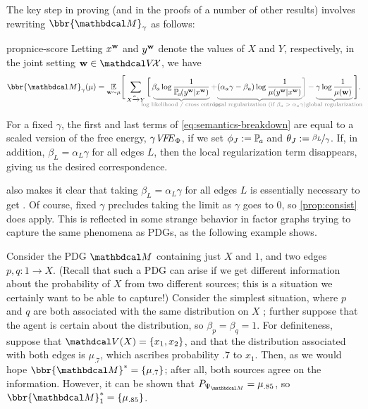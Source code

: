 The key step in proving 
(and in the proofs of a number of other results) involves 
rewriting  
$\bbr{\dg M}_\gamma$ as follows: 
\begin{linked}{prop}{nice-score}%
 Letting $x^{\mathbf w}$ and $y^{\mathbf w}$ denote the values of
  $X$ and $Y$, respectively, in
  the joint setting $\mat w \in \V\!\X$, 
we have 
\begin{equation}\label{eq:semantics-breakdown}
\begin{split}
\bbr{\dg M}_\gamma(\mu) =  \Ex_{\mat w \sim \mu}\!
\Bigg[
 \sum_{ X \xrightarrow{\!\!a} Y  }
\bigg[\,
    \color{gray}
    \underbrace{\color{black}
      \!\beta_a \log \frac{1}{\p_a(y^{\mat w} |x^{\mat w})}
	}_{\color{gray}\smash{\mathclap{\text{log likelihood / cross entropy}}}} +
    {\color{gray}\underbrace{\color{black} 
({\alpha_a}\gamma - \beta_a ) \log \frac{1}{\mu(y^{\mat w} |x^{\mat w})} 
	}_{\color{gray}\smash{\mathclap{\text{local regularization (if $\beta_a > 
	\alpha_a
	\gamma$)}}}}}\bigg] - \underbrace{\color{black}
\gamma \log \frac{1}{\mu(\mat w)}
	}_{\color{gray}\smash{\mathclap{\text{global
        regularization}}}}\color{black} \Bigg].
\end{split}
\end{equation}
\end{linked}
For a fixed $\gamma$, the first and last terms
of \eqref{eq:semantics-breakdown} are equal to a scaled
version of the free energy, $\gamma\mathit{V\mkern-4mu F\mkern-4.5mu E}_\Phi$, 
if we set $\phi_J := \p_a$ and $\theta_J := \nicefrac{\beta_L}{\gamma}$.  
If, in addition, $\beta_L = {\alpha_L}\gamma$ for all
edges $L$, then
the local regularization term disappears, giving us
the desired correspondence. 


 also makes it clear that 
taking $\beta_L = {\alpha_L} \gamma$ for all edges $L$ is
essentially necessary to get .
Of course, fixed $\gamma$ precludes taking the limit as $\gamma$ goes
to 0, so 
\cref{prop:consist} does apply. This is reflected in 
some strange
behavior in factor graphs trying to capture the same phenomena as
PDGs, as the following example shows.

\begin{example}\label{ex:overdet}
Consider the PDG $\dg M$ containing just $X$ and $1$, and two edges
$p, q: 1 \to X$.
(Recall that such a PDG can arise if we get different information about the
probability of $X$ from two different 
sources; this is a situation we
certainly want to be able to capture!)
Consider the simplest situation, where $p$ and $q$ are both associated
with the same distribution on $X$%
; further suppose that the agent is certain about the distribution, so
$\beta_p = \beta_q = 1$.
For definiteness, suppose that
$\V(X) = \{x_1,x_2\}$, and
that the distribution associated with both edges is $\mu_{.7}$, which ascribes
probability $.7$ to $x_1$. Then, as we would hope  $\bbr{\dg M}^* =
\{\mu_{.7}\}$; after all, both sources agree on the information.
However, it can be shown that 
$\Pr_{\WFGof{\dg M}} = \mu_{.85}$, so  $\bbr{\dg M}_1^* = \{\mu_{.85}\}$.
\end{example}



